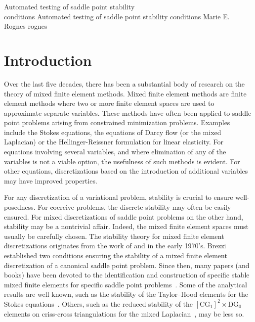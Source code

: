               {Automated testing of saddle point stability \\ conditions}
              {Automated testing of saddle point stability conditions}
              {Marie E. Rognes}
              {rognes}

\newcommand{\rognesc}{c}
\newcommand{\rognestriang}{\mathcal{T}}

\newcommand{\rognesvectorcg}[2]{[\mathrm{CG}_{#1}]^{#2}}
\newcommand{\rognescg}[1]{\mathrm{CG}_{#1}}
\newcommand{\rognesrt}[1]{\mathrm{RT}_{#1}}
\newcommand{\rognesdg}[1]{\mathrm{DG}_{#1}}
\newcommand{\rognesascot}{ASCoT}
\newcommand{\rognespython}{python}

\section{Introduction}

Over the last five decades, there has been a substantial body of
research on the theory of mixed finite element methods.  Mixed finite
element methods are finite element methods where two or more finite
element spaces are used to approximate separate variables.  These
methods have often been applied to saddle point problems arising from
constrained minimization problems. Examples include the Stokes
equations, the equations of Darcy flow (or the mixed Laplacian) or the
Hellinger-Reissner formulation for linear elasticity.  For equations
involving several variables, and where elimination of any of the
variables is not a viable option, the usefulness of such methods is
evident. For other equations, discretizations based on the
introduction of additional variables may have improved properties.

For any discretization of a variational problem, stability is crucial
to ensure well-posedness. For coercive problems, the discrete
stability may often be easily ensured. For mixed discretizations of
saddle point problems on the other hand, stability may be a nontrivial
affair. Indeed, the mixed finite element spaces must usually be
carefully chosen. The stability theory for mixed finite element
discretizations originates from the work of \citet{Babuvska1972/73}
and \citet{Brezzi1974} in the early 1970's. Brezzi established two
conditions ensuring the stability of a mixed finite element
discretization of a canonical saddle point problem.  Since then, many
papers (and books) have been devoted to the identification and
construction of specific stable mixed finite elements for specific
saddle point problems~\citep{ArnoldFalkWinther2006,
BrezziDouglasMarini1985, BrezziFalk1991, BrezziFortin1991,
RaviartThomas1977, TaylorHood1973}. Some of the analytical results are
well known, such as the stability of the Taylor--Hood elements for the
Stokes equations~\citep{BrezziFalk1991, Stenberg1984, TaylorHood1973}.
Others, such as the reduced stability of the
$\rognesvectorcg{1}{2} \times
\rognesdg{0}$ elements on criss-cross triangulations for the mixed
Laplacian~\citep{BoffiBrezziGastaldi2000}, may be less so.


